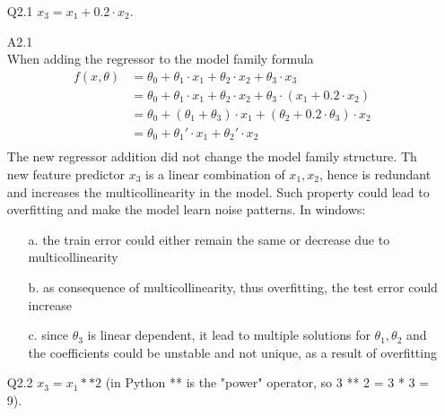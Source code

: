 \documentclass[unicode, 11pt, a4paper]{scrartcl}
\newcommand{\myex}[1]{\begin{equation*}\begin{aligned} #1 \end{aligned}\end{equation*}}
\begin{document}
\begin{itemize}
	\item[Q2.1] $x_3 = x_1 + 0.2 \cdot x_2$.

	\item[A2.1] ~\\
	      When adding the regressor to the model family formula
	      \myex{
		      f(x, \theta) &= \theta_0 + \theta_1 \cdot x_1 + \theta_2 \cdot x_2 + \theta_3 \cdot x_3\\
		      &= \theta_0 + \theta_1 \cdot x_1 + \theta_2 \cdot x_2 + \theta_3 \cdot (x_1 + 0.2 \cdot x_2)\\
		      &= \theta_0 + (\theta_1 + \theta_3) \cdot x_1 + (\theta_2 + 0.2 \cdot \theta_3) \cdot x_2\\
		      &= \theta_0 + \theta_1' \cdot x_1 + \theta_2' \cdot x_2\\
	      }
	      The new regressor addition did not change the model family structure.
	      Th new feature predictor $x_3$ is a linear combination of $x_1, x_2$,
	      hence is redundant and increases the multicollinearity in the model.
	      Such property could lead to overfitting and make the model learn noise patterns.
	      In windows:
	      \begin{itemize}
		      \item[a.] the train error could either remain the same or decrease due to multicollinearity
		      \item[b.] as consequence of multicollinearity, thus overfitting, the test error could increase
		      \item[c.] since $\theta_3$ is linear dependent, it lead to multiple solutions
		            for $\theta_1, \theta_2$ and the coefficients could be unstable and not unique,
		            as a result of overfitting
	      \end{itemize}

	\item[Q2.2] $x_3 = x_1 ** 2$ (in Python ** is the "power" operator, so  3 ** 2 = 3 * 3 = 9).


\end{itemize}
\end{document}
